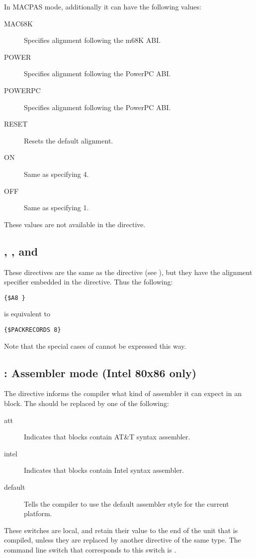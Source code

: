 In MACPAS mode, additionally it can have the following values:
\begin{description}
\item[MAC68K] Specifies alignment following the m68K ABI.
\item[POWER] Specifies alignment following the PowerPC ABI.
\item[POWERPC] Specifies alignment following the PowerPC ABI.
\item[RESET] Resets the default alignment.
\item[ON] Same as specifying 4.
\item[OFF] Same as specifying 1.
\end{description}
These values are not available in the  directive. 

\subsection{, , and }
\label{se:An}

These directives are the same as the  directive 
(see ), but they have the alignment specifier embedded in the
directive. Thus the following:
\begin{verbatim}
{$A8 }
\end{verbatim}
is equivalent to 
\begin{verbatim}
{$PACKRECORDS 8}
\end{verbatim}
Note that the special cases of  cannot be expressed this
way.

\subsection{ : Assembler mode (Intel 80x86 only)}
\label{se:AsmReader}


The  directive informs the compiler what kind of assembler
it can expect in an  block. The  should be replaced by one
of the following:
\begin{description}
\item [att\ ] Indicates that  blocks contain AT\&T syntax assembler.
\item [intel\ ] Indicates that  blocks contain Intel syntax
assembler.
\item [default\ ] Tells the compiler to use the default assembler style for
the current platform.
\end{description}
These switches are local, and retain their value to the end of the unit that
is compiled, unless they are replaced by another directive of the same type.
The command line switch that corresponds to this switch is .

